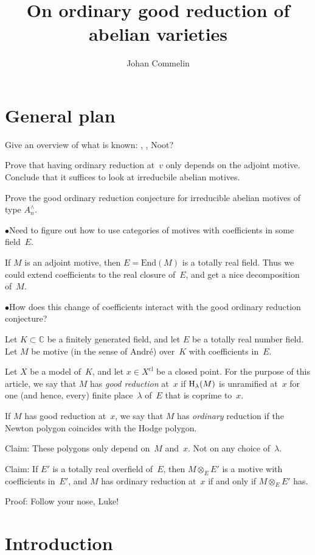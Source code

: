 \documentclass{amsart}
\title{On ordinary good reduction of abelian varieties}
\author{Johan Commelin}
\def\HH{\textnormal{H}}
\begin{document}
\maketitle

\section{General plan}

Give an overview of what is known:
\cite{MR1603865},
\cite{MR3494322},
Noot?

Prove that having ordinary reduction at~$v$ only depends on the adjoint motive.
Conclude that it suffices to look at irreducbile abelian motives.

Prove the good ordinary reduction conjecture
for irreducible abelian motives of type $A_n^\wedge$.

$\bullet$\quad Need to figure out how to use categories of motives
with coefficients in some field~$E$.

If $M$ is an adjoint motive,
then $E = \mathrm{End}(M)$ is a totally real field.
Thus we could extend coefficients to the real closure of~$E$,
and get a nice decomposition of~$M$.

$\bullet$\quad How does this change of coefficients interact
with the good ordinary reduction conjecture?

Let $K \subset \mathbb{C}$ be a finitely generated field,
and let $E$ be a totally real number field.
Let $M$ be motive (in the sense of Andr\'e)
over~$K$ with coefficients in~$E$.

Let $X$ be a model of~$K$,
and let $x \in X^\mathrm{cl}$ be a closed point.
For the purpose of this article,
we say that $M$ has \emph{good reduction} at~$x$
if $\HH_\lambda(M)$ is unramified at~$x$
for one (and hence, every) finite place~$\lambda$ of~$E$ that is coprime to~$x$.

If $M$ has good reduction at~$x$,
we say that $M$ has \emph{ordinary} reduction
if the Newton polygon coincides with the Hodge polygon.

Claim: These polygons only depend on~$M$ and~$x$.
Not on any choice of~$\lambda$.

Claim: If $E'$ is a totally real overfield of~$E$,
then $M \otimes_E E'$ is a motive with coefficients in~$E'$,
and $M$ has ordinary reduction at~$x$
if and only if $M \otimes_E E'$ has.

Proof: Follow your nose, Luke!

\section{Introduction}
\end{document}
